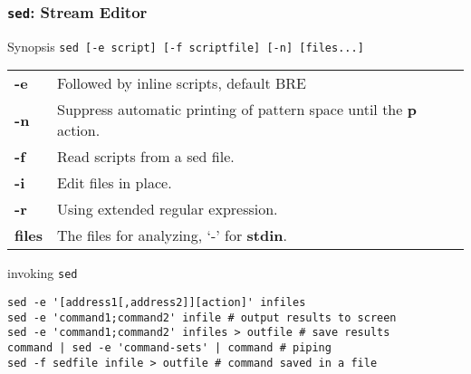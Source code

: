 \documentclass[red]{beamer}
\begin{document}
\begin{CJK*}{UTF8}{gbsn}
\begin{frame}
\frametitle{\texttt{sed}: Stream Editor}
\begin{block}{\centering\footnotesize Synopsis}
\lstinline{sed [-e script] [-f scriptfile] [-n] [files...]}
\scriptsize
\begin{tabular}{ll}
\hline
\textbf{-e} & Followed by inline scripts, default BRE\\
\textbf{-n} & Suppress automatic printing of pattern space until the \textbf{p} action.\\
\textbf{-f} & Read scripts from a sed file.\\
\textbf{-i} & Edit files in place.\\
\textbf{-r} & Using extended regular expression.\\
\textbf{files} & The files for analyzing, `-' for \textbf{stdin}.\\
\hline
\end{tabular}
\end{block}

\begin{block}{invoking \texttt{sed}}
\begin{lstlisting}
sed -e '[address1[,address2]][action]' infiles
sed -e 'command1;command2' infile # output results to screen
sed -e 'command1;command2' infiles > outfile # save results
command | sed -e 'command-sets' | command # piping
sed -f sedfile infile > outfile # command saved in a file 
\end{lstlisting}
\end{block}
\end{frame}


\end{CJK*}
\end{document}
